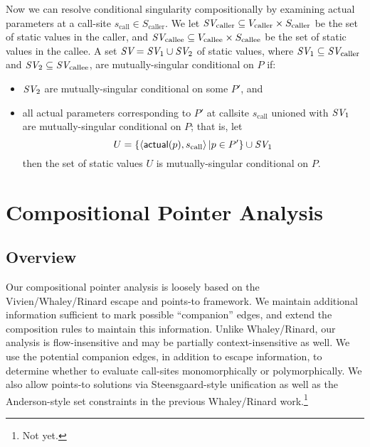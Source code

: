 \documentclass[11pt,notitlepage]{article}
\newcommand{\bigvar}[1]{\ensuremath{\text{\it #1}}}
\newcommand{\func}[1]{\ensuremath{\text{\sffamily #1}}}
\begin{document}
Now we can resolve conditional singularity compositionally by
examining actual parameters at a call-site $s_\text{call}\in S_\text{caller}$.
We let 
$\bigvar{SV}_\text{caller} \subseteq 
  V_\text{caller} \times S_\text{caller}$
be the set of static values in the caller, and
$\bigvar{SV}_\text{callee} \subseteq 
  V_\text{callee} \times S_\text{callee}$
be the set of static values in the callee.
A set $\bigvar{SV}=\bigvar{SV}_1 \cup \bigvar{SV}_2$ of static values,
where $\bigvar{SV}_1\subseteq \bigvar{SV}_\text{caller}$ and
      $\bigvar{SV}_2\subseteq \bigvar{SV}_\text{callee}$,
are mutually-singular conditional on $P$ if:
\begin{itemize}
\item $\bigvar{SV}_2$ are mutually-singular conditional on some $P'$,
and
\item all actual parameters corresponding to $P'$ at callsite $s_\text{call}$
  unioned with $\bigvar{SV}_1$ are mutually-singular conditional on $P$;
  that is, let
\begin{displaymath}
U = 
\left\{\tuple{\func{actual}(p), s_\text{call}} | p \in P' \right\}
    \cup
\bigvar{SV}_1
\end{displaymath}
then the set of static values $U$ is mutually-singular conditional on $P$.
\end{itemize}



\section{Compositional Pointer Analysis}

\subsection{Overview}
Our compositional pointer analysis is loosely based on the Vivien/Whaley/Rinard
escape and points-to framework.  We maintain additional
information sufficient to mark possible ``companion'' edges, and
extend the composition rules to maintain this information.
Unlike Whaley/Rinard, our analysis is flow-insensitive
and may be partially context-insensitive as well.  
We use the potential companion edges, in addition to escape information,
to determine whether to evaluate call-sites monomorphically or
polymorphically.
We also allow points-to solutions via Steensgaard-style unification as well as
the Anderson-style set constraints in the previous Whaley/Rinard
work.\footnote{Not yet.}
\end{document}
